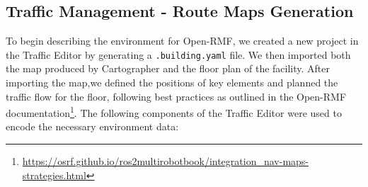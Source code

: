 \subsection{Traffic Management - Route Maps Generation}
To begin describing the environment for Open-RMF, we created a new project in the Traffic Editor by generating a \texttt{.building.yaml} file. We then imported both the map produced by Cartographer and the floor plan of the facility. After importing the map,we defined the positions of key elements and planned the traffic flow for the floor, following best practices as outlined in the Open-RMF documentation\footnote{\href{https://osrf.github.io/ros2multirobotbook/integration\_nav-maps-strategies.html}{https://osrf.github.io/ros2multirobotbook/integration\_nav-maps-strategies.html}}. The following components of the Traffic Editor were used to encode the necessary environment data:
